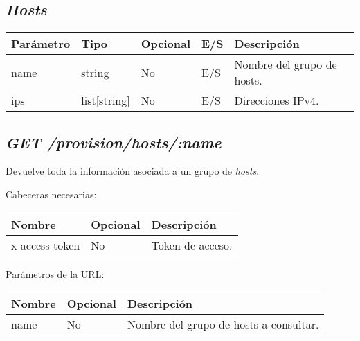 \subsection{\textit{Hosts}}
\label{sec:hosts}
\begin{table}[h!]
	\centering
	\begin{adjustbox}{max width=\textwidth}
	\begin{tabular}{|l|l|l|l|l|}
		\hline
		Parámetro & Tipo & Opcional & E/S & Descripción \\ \hline
		name & string & No & E/S & Nombre del grupo de hosts. \\ \hline
		ips & list[string] & No & E/S & Direcciones IPv4. \\ \hline
	\end{tabular}
\end{adjustbox}
\end{table}

\subsection{\textit{GET /provision/hosts/:name}}

Devuelve toda la información asociada a un grupo de \textit{hosts}.

Cabeceras necesarias:

\begin{table}[h!]
	\centering
	\begin{adjustbox}{max width=\textwidth}
	\begin{tabular}{|l|l|l|}
		\hline
		Nombre & Opcional & Descripción \\ \hline
		x-access-token & No & Token de acceso. \\ \hline
	\end{tabular}
\end{adjustbox}
\end{table}

Parámetros de la URL:

\begin{table}[h!]
	\centering
	\begin{adjustbox}{max width=\textwidth}
	\begin{tabular}{|l|l|l|}
		\hline
		Nombre & Opcional & Descripción \\ \hline
		name & No & Nombre del grupo de hosts a consultar. \\ \hline
	\end{tabular}
\end{adjustbox}
\end{table}

